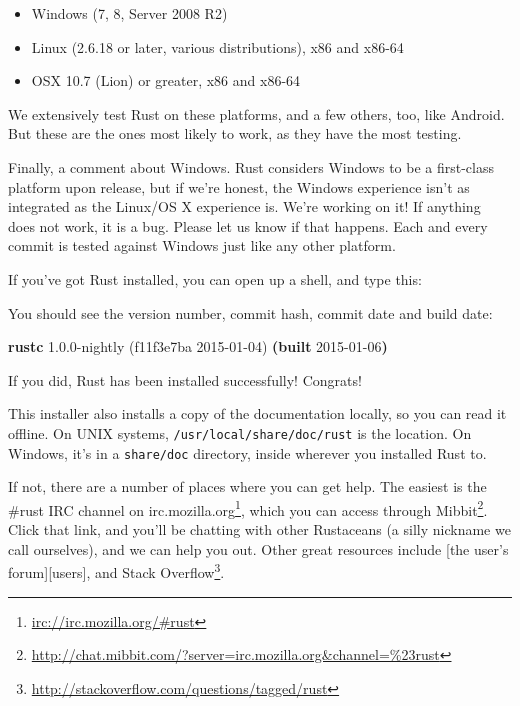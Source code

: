 \documentclass[a4paper,]{book}
\newenvironment{Shaded}{\begin{snugshade}}{\end{snugshade}}
\newcommand{\KeywordTok}[1]{\textcolor[rgb]{0.13,0.29,0.53}{\textbf{{#1}}}}
\newcommand{\NormalTok}[1]{{#1}}
\renewcommand{\href}[2]{#2\footnote{\url{#1}}}
\begin{document}
\begin{itemize}
\itemsep1pt\parskip0pt
\item
  Windows (7, 8, Server 2008 R2)
\item
  Linux (2.6.18 or later, various distributions), x86 and x86-64
\item
  OSX 10.7 (Lion) or greater, x86 and x86-64
\end{itemize}

We extensively test Rust on these platforms, and a few others, too, like
Android. But these are the ones most likely to work, as they have the
most testing.

Finally, a comment about Windows. Rust considers Windows to be a
first-class platform upon release, but if we're honest, the Windows
experience isn't as integrated as the Linux/OS X experience is. We're
working on it! If anything does not work, it is a bug. Please let us
know if that happens. Each and every commit is tested against Windows
just like any other platform.

If you've got Rust installed, you can open up a shell, and type this:

\begin{Shaded}
\end{Shaded}

You should see the version number, commit hash, commit date and build
date:

\begin{Shaded}
\begin{Highlighting}[]
\KeywordTok{rustc} \NormalTok{1.0.0-nightly (f11f3e7ba 2015-01-04) }\KeywordTok{(built} \NormalTok{2015-01-06}\KeywordTok{)}
\end{Highlighting}
\end{Shaded}

If you did, Rust has been installed successfully! Congrats!

This installer also installs a copy of the documentation locally, so you
can read it offline. On UNIX systems, \texttt{/usr/local/share/doc/rust}
is the location. On Windows, it's in a \texttt{share/doc} directory,
inside wherever you installed Rust to.

If not, there are a number of places where you can get help. The easiest
is \href{irc://irc.mozilla.org/\#rust}{the \#rust IRC channel on
irc.mozilla.org}, which you can access through
\href{http://chat.mibbit.com/?server=irc.mozilla.org\&channel=\%23rust}{Mibbit}.
Click that link, and you'll be chatting with other Rustaceans (a silly
nickname we call ourselves), and we can help you out. Other great
resources include {[}the user's forum{]}{[}users{]}, and
\href{http://stackoverflow.com/questions/tagged/rust}{Stack Overflow}.
\end{document}
